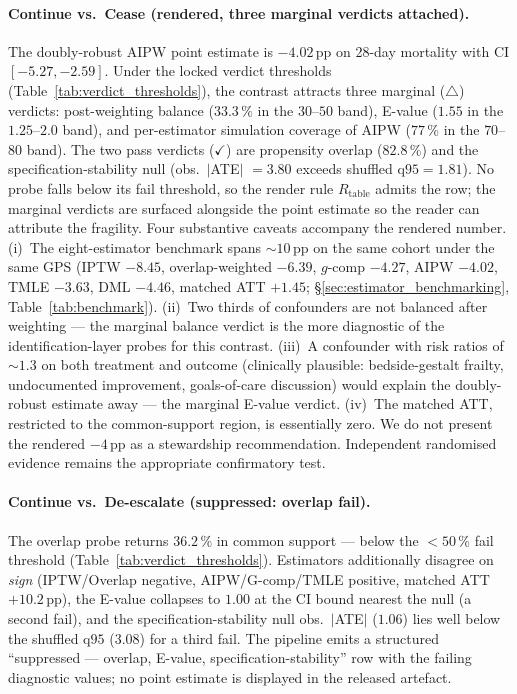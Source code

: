 \documentclass[11pt,a4paper]{article}
\begin{document}
\paragraph{Continue vs.\ Cease (rendered, three marginal verdicts attached).} The doubly-robust AIPW point estimate is $-4.02$\,pp on 28-day mortality with CI $[-5.27, -2.59]$. Under the locked verdict thresholds (Table~\ref{tab:verdict_thresholds}), the contrast attracts three marginal ($\triangle$) verdicts: post-weighting balance ($33.3\,\%$ in the $30$--$50$ band), E-value ($1.55$ in the $1.25$--$2.0$ band), and per-estimator simulation coverage of AIPW ($77\,\%$ in the $70$--$80$ band). The two pass verdicts ($\checkmark$) are propensity overlap ($82.8\,\%$) and the specification-stability null (obs.\ $|$ATE$|$ $= 3.80$ exceeds shuffled q$95 = 1.81$). No probe falls below its fail threshold, so the render rule $R_{\text{table}}$ admits the row; the marginal verdicts are surfaced alongside the point estimate so the reader can attribute the fragility. Four substantive caveats accompany the rendered number. (i)~The eight-estimator benchmark spans $\sim 10$\,pp on the same cohort under the same GPS (IPTW $-8.45$, overlap-weighted $-6.39$, $g$-comp $-4.27$, AIPW $-4.02$, TMLE $-3.63$, DML $-4.46$, matched ATT $+1.45$; \S\ref{sec:estimator_benchmarking}, Table~\ref{tab:benchmark}). (ii)~Two thirds of confounders are not balanced after weighting --- the marginal balance verdict is the more diagnostic of the identification-layer probes for this contrast. (iii)~A confounder with risk ratios of $\sim 1.3$ on both treatment and outcome (clinically plausible: bedside-gestalt frailty, undocumented improvement, goals-of-care discussion) would explain the doubly-robust estimate away --- the marginal E-value verdict. (iv)~The matched ATT, restricted to the common-support region, is essentially zero. We do not present the rendered $-4$\,pp as a stewardship recommendation. Independent randomised evidence remains the appropriate confirmatory test.

\paragraph{Continue vs.\ De-escalate (suppressed: overlap fail).} The overlap probe returns $36.2\,\%$ in common support --- below the $<50\,\%$ fail threshold (Table~\ref{tab:verdict_thresholds}). Estimators additionally disagree on \emph{sign} (IPTW/Overlap negative, AIPW/G-comp/TMLE positive, matched ATT $+10.2$\,pp), the E-value collapses to $1.00$ at the CI bound nearest the null (a second fail), and the specification-stability null obs.\ $|$ATE$|$ ($1.06$) lies well below the shuffled q$95$ ($3.08$) for a third fail. The pipeline emits a structured ``suppressed --- overlap, E-value, specification-stability'' row with the failing diagnostic values; no point estimate is displayed in the released artefact.
\end{document}

